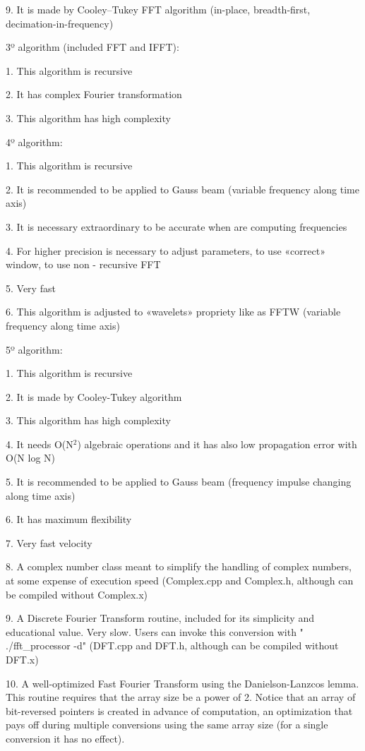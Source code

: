 \documentclass[12pt,a4paper,openany]{article}
\begin{document}
9.	It is made by Cooley–Tukey FFT algorithm (in-place, breadth-first, decimation-in-frequency)


3º algorithm (included FFT and IFFT):


1.	This algorithm is recursive


2.	It has complex Fourier transformation


3.	This algorithm has high complexity


4º algorithm:


1.	This algorithm is recursive


2.	It is recommended to be applied to Gauss beam (variable frequency along time axis)


3.	It is necessary extraordinary to be accurate when are computing frequencies


4.	For higher precision is necessary to adjust parameters, to use «correct» window, to use non - recursive FFT


5.	Very fast


6.	This algorithm is adjusted to «wavelets» propriety like as FFTW (variable frequency along time axis)


5º algorithm:


1.	This algorithm is recursive


2.	It is made by Cooley-Tukey algorithm


3.	This algorithm has high complexity


4.	It needs O(N$^{2}$) algebraic operations and it has also low propagation error with O(N log N)


5.	It is recommended to be applied to Gauss beam (frequency impulse changing along time axis)


6.	It has maximum flexibility


7.	Very fast velocity


8.	A complex number class meant to simplify the handling of complex numbers, at some expense of execution speed (Complex.cpp and Complex.h, although can be compiled without Complex.x)


9.	A Discrete Fourier Transform routine, included for its simplicity and educational value. Very slow. Users can invoke this conversion with " ./fft_processor -d" (DFT.cpp and DFT.h, although can be compiled without DFT.x)


10.	A well-optimized Fast Fourier Transform using the Danielson-Lanzcos lemma. This routine requires that the array size be a power of 2. Notice that an array of bit-reversed pointers is created in advance of computation, an optimization that pays off during multiple conversions using the same array size (for a single conversion it has no effect).
\end{document}
